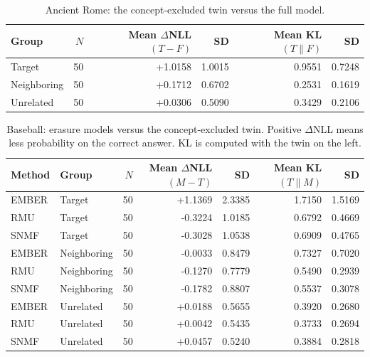 \begin{table}[t]
\centering
\small
\begin{tabular}{lrrrrr}
\toprule
Group & $N$ & Mean $\Delta$NLL$(T{-}F)$ & SD & Mean KL$(T\|F)$ & SD \\
\midrule
Target & 50 & +1.0158 & 1.0015 & 0.9551 & 0.7248 \\
Neighboring & 50 & +0.1712 & 0.6702 & 0.2531 & 0.1619 \\
Unrelated & 50 & +0.0306 & 0.5090 & 0.3429 & 0.2106 \\
\bottomrule
\end{tabular}
\caption{Ancient Rome: the concept-excluded twin versus the full model.}
\label{tab:rome-twin-vs-full}
\end{table}

\begin{table}[t]
\centering
\small
\begin{tabular}{llrrrrr}
\toprule
Method & Group & $N$ & Mean $\Delta$NLL$(M{-}T)$ & SD & Mean KL$(T\|M)$ & SD \\
\midrule
EMBER & Target & 50 & +1.1369 & 2.3385 & 1.7150 & 1.5169 \\
RMU & Target & 50 & -0.3224 & 1.0185 & 0.6792 & 0.4669 \\
SNMF & Target & 50 & -0.3028 & 1.0538 & 0.6909 & 0.4765 \\
EMBER & Neighboring & 50 & -0.0033 & 0.8479 & 0.7327 & 0.7020 \\
RMU & Neighboring & 50 & -0.1270 & 0.7779 & 0.5490 & 0.2939 \\
SNMF & Neighboring & 50 & -0.1782 & 0.8807 & 0.5537 & 0.3078 \\
EMBER & Unrelated & 50 & +0.0188 & 0.5655 & 0.3920 & 0.2680 \\
RMU & Unrelated & 50 & +0.0042 & 0.5435 & 0.3733 & 0.2694 \\
SNMF & Unrelated & 50 & +0.0457 & 0.5240 & 0.3884 & 0.2818 \\
\bottomrule
\end{tabular}
\caption{Baseball: erasure models versus the concept-excluded twin. Positive $\Delta$NLL means less probability on the correct answer. KL is computed with the twin on the left.}
\label{tab:baseball-vs-twin}
\end{table}

